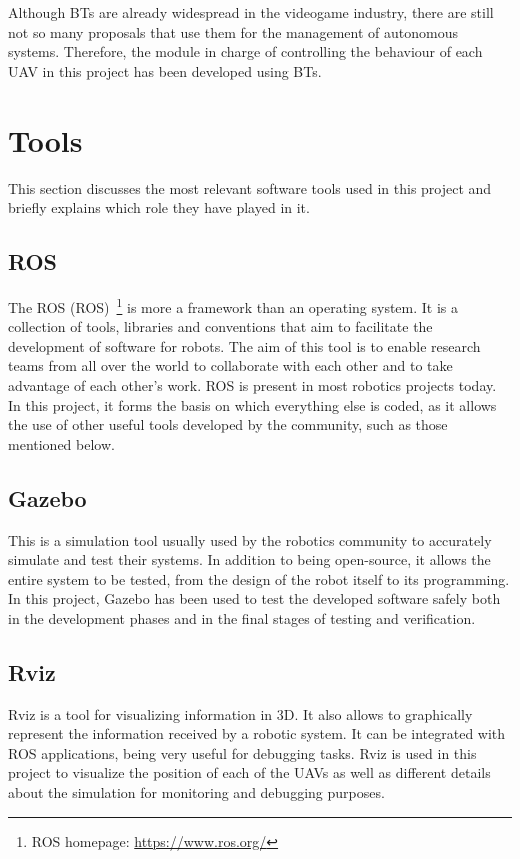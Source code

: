 Although \glspl{BT} are already widespread in the videogame industry, there are still not so many proposals that use them for the management of autonomous systems. Therefore, the module in charge of controlling the behaviour of each \gls{UAV} in this project has been developed using \glspl{BT}.

\section{Tools}
\label{sec:Tools}
This section discusses the most relevant software tools used in this project and briefly explains which role they have played in it.

\subsection{ROS}
\label{subsec:ROS}
The \acrlong{ROS} (\acrshort{ROS})~\footnote{ROS homepage: \url{https://www.ros.org/}} is more a framework than an operating system. It is a collection of tools, libraries and conventions that aim to facilitate the development of software for robots. The aim of this tool is to enable research teams from all over the world to collaborate with each other and to take advantage of each other's work. \gls{ROS} is present in most robotics projects today. In this project, it forms the basis on which everything else is coded, as it allows the use of other useful tools developed by the community, such as those mentioned below.

\subsection{Gazebo}
\label{subsec:Gazebo}
This is a simulation tool usually used by the robotics community to accurately simulate and test their systems. In addition to being open-source, it allows the entire system to be tested, from the design of the robot itself to its programming. In this project, Gazebo has been used to test the developed software safely both in the development phases and in the final stages of testing and verification.

\subsection{Rviz}
\label{subsec:Rviz}
Rviz is a tool for visualizing information in 3D. It also allows to graphically represent the information received by a robotic system. It can be integrated with ROS applications, being very useful for debugging tasks. Rviz is used in this project to visualize the position of each of the UAVs as well as different details about the simulation for monitoring and debugging purposes.

